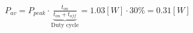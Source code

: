\documentclass[preview]{standalone}
\begin{document}
\begin{center}
$P_{av} = P_{peak} \cdot \underbrace{\frac{t_{on}}{t_{on}+t_{off}}}_{\text{Duty cycle}}=$$1.03 [W] \cdot 30 \%$$= 0.31 [W]$
\end{center}
\end{document}
